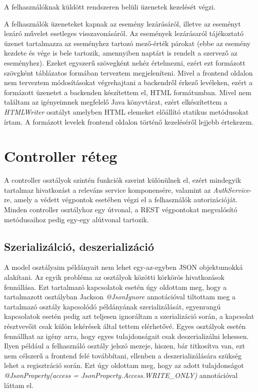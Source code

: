 \documentclass[a4paper,12pt]{report}
\theoremstyle{definition}
\theoremstyle{remark}
\begin{document}
A felhasználóknak küldött rendszeren belüli üzenetek kezelését végzi.

A felhasználók üzeneteket kapnak az esemény lezárásáról, illetve az eseményt lezáró művelet esetleges visszavonásáról. Az események lezárásaról tájékoztató üzenet tartalmazza az eseményhez tartozó mező-érték párokat (ebbe az esemény kezdete és vége is bele tartozik, amennyiben naptárt is rendelt a szervező az eseményhez). Ezeket egyszerű szövegként nehéz értelmezni, ezért ezt formázott szövgként táblázatos formában terveztem megjeleníteni. Mivel a frontend oldalon nem terveztem módosításokat végrehajtani a backendről érkező levéleken, ezért a formázott üzenetet a backenden készítettem el, HTML formátumban. Mivel nem találtam az igényeimnek megfelelő Java könyvtárat, ezért elkészítettem a \textit{HTMLWriter} osztályt amelyben HTML elemeket előállító statikus metódusokat írtam. A formázott levelek frontend oldalon történő kezeléséről lejjebb értekezem.

\section{Controller réteg}

A controller osztályok szintén funkciók szerint különülnek el, ezért mindegyik tartalmaz hivatkozást a releváns service komponensére, valamint az \textit{AuthService}-re, amely a védett végpontok esetében végzi el a felhasználók autorizációját. Minden controller osztályhoz egy útvonal, a REST végpontokat megvalósító metódusaihoz pedig egy-egy alútvonal tartozik.

\subsection{Szerializálció, deszerializáció}

A model osztályaim példányait nem lehet egy-az-egyben JSON objektumokká alakítani. Az egyik probléma az osztályok közötti körkörös hivatkozások fennállása. Ezt tartalmazó kapcsolatok esetén úgy oldottam meg, hogy a tartalmazott osztályban Jackson \textit{@JsonIgnore} annotációval tiltottam meg a tartalmazó osztály kapcsolódó példányának szerializálását, egyenrangú kapcsolatok esetén pedig azt teljesen ignoráltam a szerializáció során, a kapcsolat résztvevőit csak külön lekérések által tettem elérhetővé. Egyes osztályok esetén fennállhat az igény arra, hogy egyes tulajdonságait csak deszerializálni lehessen. Ilyen például a felhasználó osztály jelszó mezeje, hiszen, bár titkosítva van, ezt nem célszerű a frontend felé továbbítani, ellenben a deszerializálására szükség lehet a regisztráció során. Ezt úgy oldottam meg, hogy az adott tulajdonságot \textit{@JsonProperty(access = JsonProperty.Access.WRITE\_ONLY)} annotációval láttam el.
\end{document}
